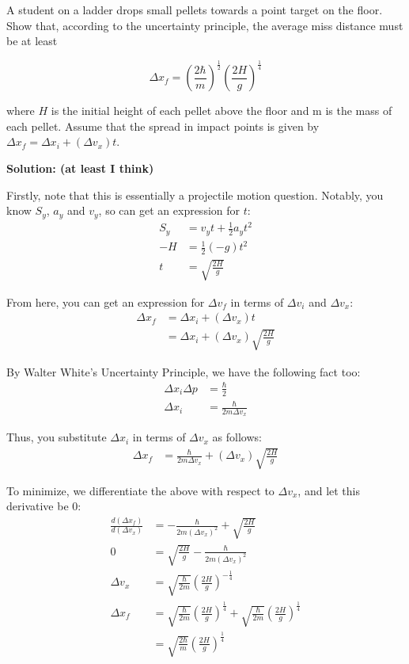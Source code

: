 \documentclass[11pt]{article}
\begin{document}
A student on a ladder drops small pellets towards a point target on the floor. Show that, according to the uncertainty principle, the average miss distance must be at least

$$\Delta x_f = \left(\frac{2\hbar}{m} \right)^\frac{1}{2} \left(\frac{2H}{g} \right)^\frac{1}{4}$$

where $H$ is the initial height of each pellet above the floor and m is the mass of each pellet. Assume that the spread in impact points is given by $\Delta x_f = \Delta x_i + (\Delta v_x) t$.

\begin{tcolorbox}
\textbf{Solution: (at least I think)}

Firstly, note that this is essentially a projectile motion question. Notably, you know $S_y$, $a_y$ and $v_y$, so can get an expression for $t$:
\begin{align*}
    S_y &= v_yt + \frac{1}2 a_y t^2 \\
    -H &= \frac{1}2 (-g) t^2 \\
    t &= \sqrt{\frac{2H}{g}}
\end{align*}

From here, you can get an expression for $\Delta v_f$ in terms of $\Delta v_i$ and $\Delta v_x$:
\begin{align*}
    \Delta x_f &= \Delta x_i + (\Delta v_x)t \\
    &= \Delta x_i + (\Delta v_x) \sqrt{\frac{2H}{g}}
\end{align*}

By Walter White's Uncertainty Principle, we have the following fact too:
\begin{align*}
    \Delta x_i \Delta p &= \frac{\hbar}{2} \\
    \Delta x_i &= \frac{\hbar}{2m\Delta v_x}
\end{align*}

Thus, you substitute $\Delta x_i$ in terms of $\Delta v_x$ as follows:
\begin{align*}
    \Delta x_f &= \frac{\hbar}{2m\Delta v_x} + (\Delta v_x) \sqrt{\frac{2H}{g}}
\end{align*}

To minimize, we differentiate the above with respect to $\Delta v_x$, and let this derivative be 0:
\begin{align*}
    \frac{d(\Delta x_f)}{d(\Delta v_x)} &= -\frac{\hbar}{2m(\Delta v_x)^2} + \sqrt{\frac{2H}{g}} \\
    0 &= \sqrt{\frac{2H}{g}} -\frac{\hbar}{2m(\Delta v_x)^2} \\
    \Delta v_x &= \sqrt{\frac{\hbar}{2m}} \left(\frac{2H}{g} \right)^{-\frac{1}4} \\
    \Delta x_f &= \sqrt{\frac{\hbar}{2m}} \left(\frac{2H}{g} \right)^{\frac{1}4} + \sqrt{\frac{\hbar}{2m}} \left(\frac{2H}{g} \right)^{\frac{1}4} \\ &= \sqrt{\frac{2\hbar}{m}} \left(\frac{2H}{g} \right)^{\frac{1}4}
\end{align*}

\end{tcolorbox}
\end{document}
